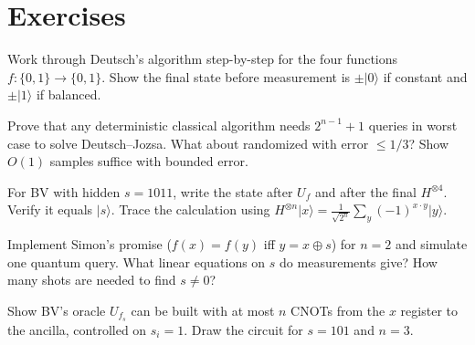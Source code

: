 \section{Exercises}
\begin{exercise}
Work through Deutsch's algorithm step-by-step for the four functions $f:\{0,1\}\to\{0,1\}$. Show the final state before measurement is $\pm\lvert0\rangle$ if constant and $\pm\lvert1\rangle$ if balanced.
\end{exercise}
\begin{exercise}
Prove that any deterministic classical algorithm needs $2^{n-1}+1$ queries in worst case to solve Deutsch--Jozsa. What about randomized with error $\le1/3$? Show $O(1)$ samples suffice with bounded error.
\end{exercise}
\begin{exercise}
For BV with hidden $s=1011$, write the state after $U_f$ and after the final $H^{\otimes4}$. Verify it equals $\lvert s\rangle$. Trace the calculation using $H^{\otimes n}\lvert x\rangle=\tfrac1{\sqrt{2^n}}\sum_y(-1)^{x\cdot y}\lvert y\rangle$.
\end{exercise}
\begin{exercise}
Implement Simon's promise ($f(x)=f(y)$ iff $y=x\oplus s$) for $n=2$ and simulate one quantum query. What linear equations on $s$ do measurements give? How many shots are needed to find $s\neq0$?
\end{exercise}
\begin{exercise}
Show BV's oracle $U_{f_s}$ can be built with at most $n$ CNOTs from the $x$ register to the ancilla, controlled on $s_i=1$. Draw the circuit for $s=101$ and $n=3$.
\end{exercise}
